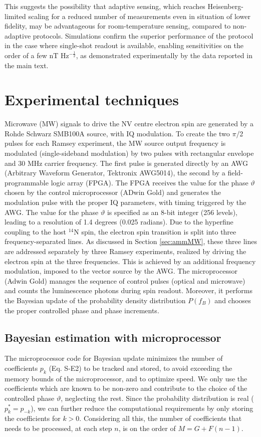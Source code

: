 This suggests the possibility that adaptive sensing, which reaches Heisenberg-limited scaling for a reduced number of measurements even in situation of lower fidelity, may be advantageous for room-temperature sensing, compared to non-adaptive protocols.
Simulations confirm the superior performance of the protocol in the case where single-shot readout is available, enabling sensitivities on the order of a few nT Hz$^{-\frac{1}{2}}$, as demonstrated experimentally by the data reported in the main text.


\section{Experimental techniques}

Microwave (MW) signals to drive the NV centre electron spin are generated by a Rohde Schwarz SMB100A source, with IQ modulation.  To create the two $\pi$/2 pulses for each Ramsey experiment, the MW source output frequency is modulated (single-sideband modulation) by two pulses with rectangular envelope and 30 MHz carrier frequency. The first pulse is generated directly by an AWG (Arbitrary Waveform Generator, Tektronix AWG5014), the second by a field-programmable logic array (FPGA). The FPGA receives the value for the phase $\vartheta$ chosen by the control microprocessor (ADwin Gold) and generates the modulation pulse with the proper IQ parameters, with timing triggered by the AWG. The value for the phase $\vartheta$ is specified as an 8-bit integer (256 levels), leading to a resolution of 1.4 degrees (0.025 radians).
Due to the hyperfine coupling to the host $^{14}$N spin, the electron spin transition is split into three frequency-separated lines. As discussed in Section \ref{sec:ammMW}, these three lines are addressed separately by three Ramsey experiments, realized by driving the electron spin at the three frequencies. This is achieved by an additional frequency modulation, imposed to the vector source by the AWG. The microprocessor (Adwin Gold) manages the sequence  of control pulses (optical and microwave) and counts the luminescence photons during spin readout. Moreover, it performs the Bayesian update of the probability density distribution $P(f_B)$ and chooses the proper controlled phase and phase increments. 

\subsection{Bayesian estimation with microprocessor}
\label{ammSI:overhead}
The microprocessor code for Bayesian update minimizes the number of coefficients $p_k$ (Eq. S-E2) to be tracked and stored, to avoid exceeding the memory bounds of the microprocessor, and to optimize speed. We only use the coefficients which are known to be non-zero and contribute to the choice of the controlled phase $\vartheta$, neglecting the rest. Since the probability distribution is real ($p_k^* = p_{-k}$), we can further reduce the computational requirements by only storing the coefficients for $k>0$. Considering all this, the number of coefficients that needs to be processed, at each step $n$, is on the order of $M = G+F(n-1)$.

